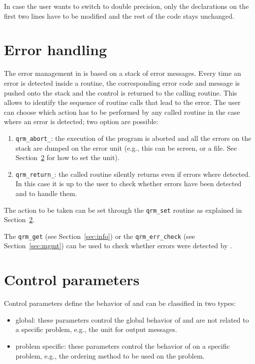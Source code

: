 \documentclass[11pt]{article}
\begin{document}


In case the user wants to switch to double precision, only the
declarations on the first two lines have to be modified and the rest
of the code stays unchanged. 


\section{Error handling}
\label{sec:error}

The error management in \qrm is based on a stack of error
messages. Every time an error is detected inside a routine, the
corresponding error code and message is pushed onto the stack and
the control is returned to the calling routine. This allows to
identify the sequence of routine calls that lead to the error. The
user can choose which action has to be performed by any called routine
in the case where an error is detected; two option are possible:
\begin{enumerate}
\item \texttt{qrm\_abort\_}: the execution of the program is aborted
  and all the errors on the stack are dumped on the error unit (e.g., this
  can be screen, or a file. See Section~\ref{sec:cntl} for how to set
  the unit).
\item \texttt{qrm\_return\_}: the called routine silently returns even
  if errors where detected. In this case it is up to the user to check
  whether errors have been detected and to handle them.
\end{enumerate}
The action to be taken can be set through the \texttt{qrm\_set}
routine as explained in Section~\ref{sec:cntl}.

The \texttt{qrm\_get} (see Section~\ref{sec:info}) or the
\texttt{qrm\_err\_check} (see Section~\ref{sec:mgmt}) can be used to
check whether errors were detected by \qrm.






\section{Control parameters}
\label{sec:cntl}

Control parameters define the behavior of \qrm and can be classified
in two types:
\begin{itemize}
\item global: these parameters control the global behavior of \qrm and
  are not related to a specific problem, e.g., the unit for output
  messages.
\item problem specific: these parameters control the behavior of \qrm
  on a specific problem, e.g., the ordering method to be used on the
  problem.
\end{itemize}
\end{document}
